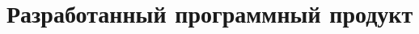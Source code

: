 \documentclass{main.tex}[subfiles]
\begin{document}
\section{Разработанный программный продукт}
\end{document}
